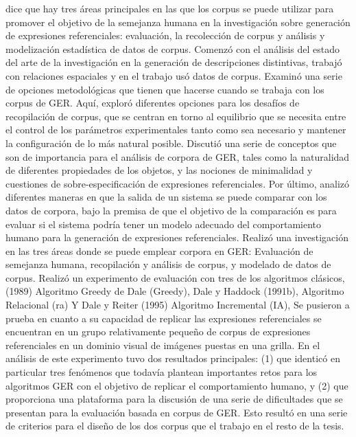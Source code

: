 \cite{viethen-phd} dice que hay tres \'areas principales en las que los corpus se puede utilizar para
promover el objetivo de la semejanza humana en la investigaci\'on sobre generaci\'on de expresiones referenciales:
evaluaci\'on, la recolecci\'on de corpus y an\'alisis y modelizaci\'on estad\'istica de
datos de corpus.
Comenz\'o con el an\'alisis del estado del arte de la investigaci\'on en
la generaci\'on de descripciones distintivas, trabaj\'o con relaciones espaciales y en el trabajo us\'o datos de corpus. Examin\'o una serie de opciones metodol\'ogicas que tienen que hacerse cuando se trabaja con los corpus de GER. Aqu\'i, explor\'o diferentes opciones para los desaf\'ios de recopilaci\'on de corpus, que se centran en torno al equilibrio que se necesita
entre el control de los par\'ametros experimentales tanto como sea necesario
y mantener la configuraci\'on de lo m\'as natural posible. Discuti\'o una serie de conceptos
que son de importancia para el an\'alisis de corpora de GER, tales como la naturalidad de diferentes
propiedades de los objetos, y las nociones de minimalidad y cuestiones de sobre-especificaci\'on de expresiones referenciales. Por \'ultimo, analiz\'o diferentes maneras en que la salida de un sistema se puede
comparar con los datos de corpora, bajo la premisa de que el objetivo de la comparaci\'on es
para evaluar si el sistema podr\'ia tener un modelo adecuado del comportamiento humano para la generaci\'on de expresiones referenciales.
Realiz\'o una investigaci\'on en las tres \'areas donde se puede emplear corpora en GER: Evaluaci\'on de semejanza humana, recopilaci\'on y an\'alisis de corpus, y modelado de datos de corpus. Realiz\'o un experimento de evaluaci\'on con tres de los algoritmos cl\'asicos, (1989) Algoritmo Greedy de Dale (Greedy), Dale y Haddock (1991b), Algoritmo Relacional (ra) Y Dale y Reiter (1995) Algoritmo Incremental (IA), Se pusieron a prueba en cuanto a su capacidad de
replicar las expresiones referenciales se encuentran en un grupo relativamente peque\~no de corpus de expresiones referenciales
en un dominio visual de im\'agenes puestas en una grilla.
En el an\'alisis de este experimento tuvo dos resultados principales: (1) que identic\'o en particular tres 
fen\'omenos que todav\'ia plantean importantes retos para los algoritmos GER con el objetivo de replicar
el comportamiento humano, y (2) que proporciona una plataforma para la discusi\'on de una serie de
dificultades que se presentan para la evaluaci\'on basada en corpus de GER. Esto result\'o en una serie
de criterios para el dise\~no de los dos corpus que el trabajo en el resto de la tesis.

